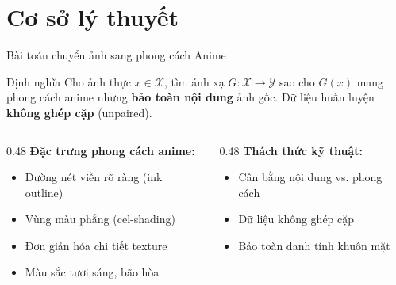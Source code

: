 \documentclass[aspectratio=169,12pt]{beamer}
\begin{document}
\section{Cơ sở lý thuyết}

\begin{frame}{Bài toán chuyển ảnh sang phong cách Anime}
\begin{block}{Định nghĩa}
Cho ảnh thực $x \in \mathcal{X}$, tìm ánh xạ $G: \mathcal{X} \to \mathcal{Y}$ sao cho $G(x)$ mang phong cách anime nhưng \textbf{bảo toàn nội dung} ảnh gốc. Dữ liệu huấn luyện \textbf{không ghép cặp} (unpaired).
\end{block}

\begin{columns}[T]
\begin{column}{0.48\textwidth}
\textbf{Đặc trưng phong cách anime:}
\begin{itemize}
    \item Đường nét viền rõ ràng (ink outline)
    \item Vùng màu phẳng (cel-shading)
    \item Đơn giản hóa chi tiết texture
    \item Màu sắc tươi sáng, bão hòa
\end{itemize}
\end{column}
\begin{column}{0.48\textwidth}
\textbf{Thách thức kỹ thuật:}
\begin{itemize}
    \item Cân bằng nội dung vs. phong cách
    \item Dữ liệu không ghép cặp
    \item Bảo toàn danh tính khuôn mặt
\end{itemize}
\end{column}
\end{columns}
\end{frame}
\end{document}
